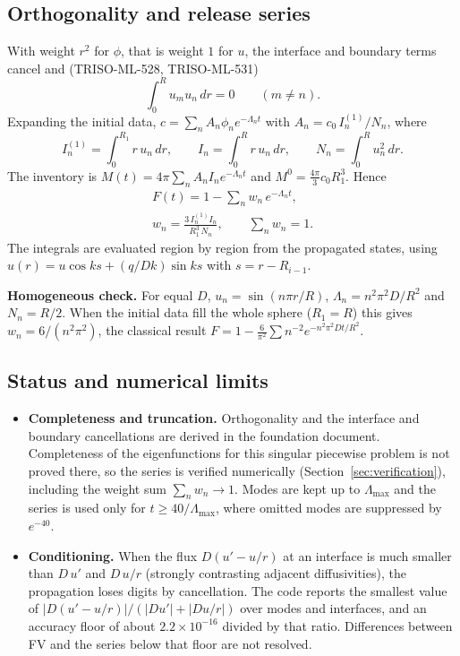 \documentclass[11pt]{article}
\begin{document}
\subsection{Orthogonality and release series}
With weight $r^2$ for $\phi$, that is weight $1$ for $u$, the interface and boundary terms cancel and (TRISO-ML-528, TRISO-ML-531)
\[
\int_0^R u_mu_n\,dr=0\qquad(m\ne n).
\]
Expanding the initial data, $c=\sum_nA_n\phi_ne^{-\Lambda_nt}$ with $A_n=c_0\,I^{(1)}_n/N_n$, where
\begin{equation}
I^{(1)}_n=\int_0^{R_1}r\,u_n\,dr,\qquad I_n=\int_0^{R}r\,u_n\,dr,\qquad N_n=\int_0^{R}u_n^2\,dr.
\tag{TRISO-DEL-020}
\end{equation}
The inventory is $M(t)=4\pi\sum_nA_nI_ne^{-\Lambda_nt}$ and $M^0=\tfrac{4\pi}{3}c_0R_1^3$. Hence
\begin{equation}
\begin{gathered}
F(t)=1-\sum_{n}w_n\,e^{-\Lambda_nt},\\
w_n=\frac{3\,I^{(1)}_nI_n}{R_1^3\,N_n},\qquad\sum_nw_n=1.
\end{gathered}
\tag{TRISO-DEL-021}
\end{equation}
The integrals are evaluated region by region from the propagated states, using $u(r)=u\cos ks+(q/Dk)\sin ks$ with $s=r-R_{i-1}$.

\textbf{Homogeneous check.} For equal $D$, $u_n=\sin(n\pi r/R)$, $\Lambda_n=n^2\pi^2D/R^2$ and $N_n=R/2$. When the initial data fill the whole sphere ($R_1=R$) this gives $w_n=6/(n^2\pi^2)$, the classical result $F=1-\tfrac{6}{\pi^2}\sum n^{-2}e^{-n^2\pi^2Dt/R^2}$.

\subsection{Status and numerical limits}
\begin{itemize}
\item \textbf{Completeness and truncation.} Orthogonality and the interface and boundary cancellations are derived in the foundation document. Completeness of the eigenfunctions for this singular piecewise problem is not proved there, so the series is verified numerically (Section~\ref{sec:verification}), including the weight sum $\sum_nw_n\to1$. Modes are kept up to $\Lambda_{\max}$ and the series is used only for $t\ge40/\Lambda_{\max}$, where omitted modes are suppressed by $e^{-40}$.
\item \textbf{Conditioning.} When the flux $D(u'-u/r)$ at an interface is much smaller than $D\,u'$ and $D\,u/r$ (strongly contrasting adjacent diffusivities), the propagation loses digits by cancellation. The code reports the smallest value of $|D(u'-u/r)|/(|Du'|+|Du/r|)$ over modes and interfaces, and an accuracy floor of about $2.2\times10^{-16}$ divided by that ratio. Differences between FV and the series below that floor are not resolved.
\end{itemize}
\end{document}
